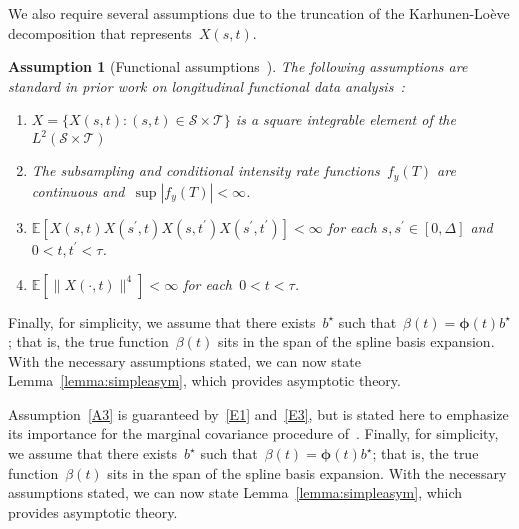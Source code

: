 \documentclass[11pt]{amsart}
\def\E{\mathcal{E}}
\newtheorem{assumption}[thm]{Assumption}
\def\E{\mathbb{E}}
\begin{document}
We also require several assumptions due to the truncation of the Karhunen-Lo{\`e}ve decomposition that represents~$X(s,t)$.
\begin{assumption}[Functional assumptions~\citep{Park2018}] \normalfont
\label{assumption:truncation}
The following assumptions are standard in prior work on longitudinal functional data analysis~\citep{Park2018, Yao2005, ChenMuller2012}:
\begin{enumerate}[label=(A.\arabic*)]
\item\label{A1} $X = \{ X(s, t) : (s,t) \in \mathcal{S} \times
  \mathcal{T} \}$ is a square integrable element of the $L^2 (
  \mathcal{S} \times \mathcal{T})$
\item\label{A2} The subsampling and conditional intensity rate functions~$f_y(T)$ are continuous and~$\sup |f_y(T)| < \infty$.
\item\label{A3} $\E[X(s,t) X(s^\prime, t) X(s,t^\prime)
  X(s^\prime, t^\prime) ] < \infty$ for
  each $s,s^\prime \in [0,\Delta]$ and~$0 < t, t^\prime < \tau$.
\item\label{A4} $\E[\|X(\cdot, t)\|^4] < \infty$ for each~$0< t < \tau$.
\end{enumerate}
\end{assumption}
Finally, for simplicity, we assume that there exists~$b^\star$ such that~$\beta(t) = \mathbold{\phi} (t) b^\star$; that is, the true function~$\beta(t)$ sits in the span of the spline basis expansion. With the necessary assumptions stated, we can now state Lemma~\ref{lemma:simpleasym}, which provides asymptotic theory.

Assumption~\ref{A3} is guaranteed by~\ref{E1} and~\ref{E3}, but is stated here to emphasize its importance for the marginal covariance procedure of~\cite{Park2018}. Finally, for simplicity, we assume that there exists~$b^\star$ such that~$\beta(t) = \mathbold{\phi} (t) b^\star$; that is, the true function~$\beta(t)$ sits in the span of the spline basis expansion. With the necessary assumptions stated, we can now state Lemma~\ref{lemma:simpleasym}, which provides asymptotic theory.
\end{document}
